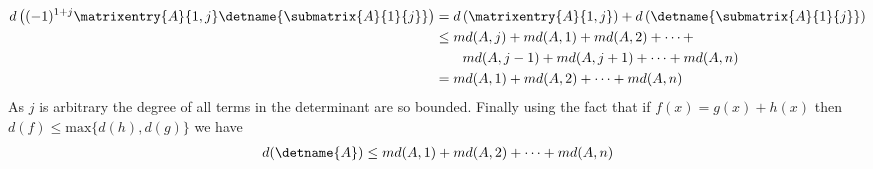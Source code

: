 %
\begin{align*}
d\left((-1)^{1+j}\matrixentry{A}{1,j}\detname{\submatrix{A}{1}{j}}\right)
&=d\left(\matrixentry{A}{1,j}\right)+d\left(\detname{\submatrix{A}{1}{j}}\right) \\
&\leq md(A,j)+md(A,1)+md(A,2)+\cdots+\\
&\quad\quad md(A,j-1)+md(A,j+1)+\cdots+md(A,n)\\
&=md(A,1)+md(A,2)+\cdots+md(A,n)
\end{align*}
%
As $j$ is arbitrary the degree of all terms in the determinant are so bounded. Finally using the fact that if $f(x)=g(x)+h(x)$ then $d(f)\leq \text{max}\{d(h),d(g)\}$ we have
%
\begin{align*}
d(\detname{A})\leq md(A,1)+md(A,2)+\cdots+md(A,n)
\end{align*}
%
